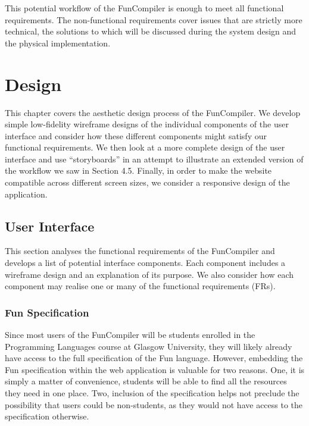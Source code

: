 \documentclass{l4proj}
\begin{document}
This potential workflow of the FunCompiler is enough to meet all functional requirements. The non-functional requirements cover issues that are strictly more technical, the solutions to which will be discussed during the system design and the physical implementation.

\chapter{Design}
This chapter covers the aesthetic design process of the FunCompiler. We develop simple low-fidelity wireframe designs of the individual components of the user interface and consider how these different components might satisfy our functional requirements. We then look at a more complete design of the user interface and use ``storyboards'' in an attempt to illustrate an extended version of the workflow we saw in Section 4.5. Finally, in order to make the website compatible across different screen sizes, we consider a responsive design of the application.


\section{User Interface}
This section analyses the functional requirements of the FunCompiler and develops a list of potential interface components. Each component includes a wireframe design and an explanation of its purpose. We also consider how each component may realise one or many of the functional requirements (FRs).

\subsection{Fun Specification}
Since most users of the FunCompiler will be students enrolled in the Programming Languages course at Glasgow University, they will likely already have access to the full specification of the Fun language. However, embedding the Fun specification within the web application is valuable for two reasons. One, it is simply a matter of convenience, students will be able to find all the resources they need in one place. Two, inclusion of the specification helps not preclude the possibility that users could be non-students, as they would not have access to the specification otherwise. 
\end{document}
